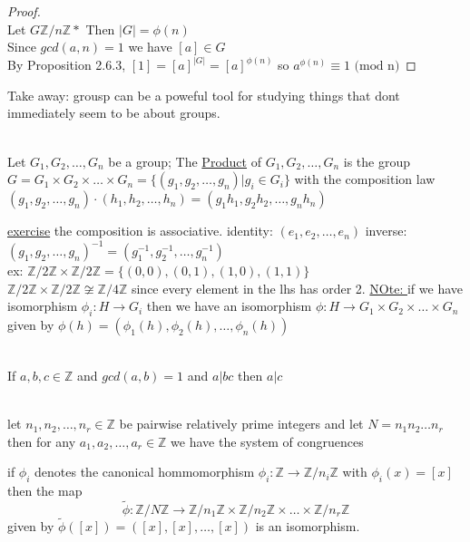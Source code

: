 \documentclass{article}
\begin{document}
\begin{proof} \leavevmode \\ 
    Let $G \mathbb{Z} / n\mathbb{Z} *$ Then $|G| = \phi(n)$  \\ 
    Since $gcd(a,n) = 1$ we have $[a] \in G$ \\ 
    By Proposition 2.6.3, $[1] = [a]^{|G|} = [a]^{\phi(n)}$ so $a^{\phi(n)} \equiv 1 \text{ (mod n)}$ 
    
\end{proof}
Take away: grousp can be a poweful tool for studying things that dont immediately seem to be about groups.
\begin{definition}
    \leavevmode \\ 
Let $G_1, G_2, \dots, G_n$ be a group; The \underline{Product} of $G_1, G_2, \dots, G_n$ is the group $G  = G_1 \times G_2 \times \dots \times G_n = \{(g_1, g_2, \dots, g_n) | g_i \in G_i \}$ with the composition law $(g_1, g_2, \dots, g_n) \cdot (h_1, h_2, \dots, h_n) = (g_1h_1, g_2h_2, \dots, g_nh_n)$


\end{definition}
\underline{exercise} the composition is associative. 
identity: $(e_1, e_2, \dots, e_n)$
inverse: $(g_1, g_2, \dots, g_n)^{-1} = (g_1^{-1}, g_2^{-1}, \dots, g_n^{-1})$ \\ 
ex: $\mathbb{Z} / 2\mathbb{Z} \times \mathbb{Z} / 2\mathbb{Z} = \{(0,0), (0,1), (1,0), (1,1)\}$  \\ 


$\mathbb{Z} / 2\mathbb{Z} \times \mathbb{Z} / 2\mathbb{Z}  \not \cong \mathbb{Z} / 4\mathbb{Z}$  since every element in the lhs has order 2. 
\underline{NOte: } if we have isomorphism $\phi_i: H \rightarrow G_i$ then we have an isomorphism $\phi: H \rightarrow G_1 \times G_2 \times \dots \times G_n$ given by $\phi(h) = (\phi_1(h), \phi_2(h), \dots, \phi_n(h))$ \\ 

\begin{lemma}[cor 1.5.11 ii ]\leavevmode \\ 
    If $a, b, c \in \mathbb{Z}$ and $gcd(a,b) = 1$ and $a | bc$ then $a | c$
 \end{lemma}
 \begin{proposition}[2.8.2]
    \leavevmode \\ 
    let $n_1, n_2, \dots, n_r \in \mathbb{Z} $ be pairwise relatively prime integers and let $N = n_1n_2 \dots n_r$ then for any $a_1, a_2, \dots, a_r \in \mathbb{Z}$ we have the system of congruences
    
 \end{proposition}
 if $\phi_i$ denotes the canonical hommomorphism $\phi_i: \mathbb{Z} \rightarrow \mathbb{Z} / n_i\mathbb{Z}$  with $\phi_i(x) = [x]$ then the map $$\tilde{\phi}:\mathbb{Z} / N\mathbb{Z} \rightarrow \mathbb{Z} / n_1 \mathbb{Z} \times \mathbb{Z} / n_2 \mathbb{Z} \times \dots \times \mathbb{Z} / n_r \mathbb{Z}$$ given by $\tilde{\phi}([x]) = ([x], [x], \dots, [x])$ is an isomorphism.
\end{document}
